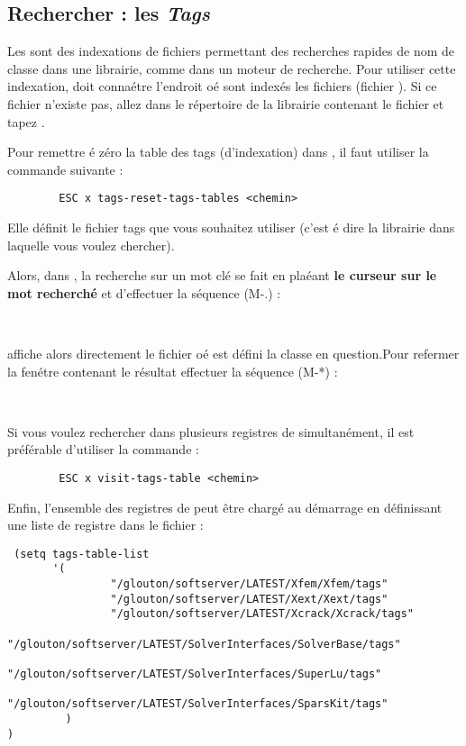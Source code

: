 

\subsection{Rechercher : les \emph{Tags}} \label{tags}

Les  sont des indexations de fichiers permettant des
recherches rapides de nom de classe dans une librairie, comme dans
un moteur de recherche. Pour utiliser cette indexation, 
doit conna\'etre l'endroit o\'e sont index\'es les fichiers (fichier
). Si ce fichier n'existe pas, allez dans le
r\'epertoire de la librairie contenant le fichier  et
tapez .

Pour remettre \'e z\'ero la table des tags (d'indexation) dans
, il faut utiliser la commande  suivante :
\begin{verbatim}
        ESC x tags-reset-tags-tables <chemin>
\end{verbatim}
Elle d\'efinit le fichier tags que vous souhaitez utiliser (c'est \'e
dire la librairie dans laquelle vous voulez chercher).


Alors, dans , la recherche sur un mot cl\'e se fait en
pla\'eant \textbf{ le curseur sur le mot recherch\'e} et d'effectuer la
s\'equence (M-.) :
\begin{description}
 \item[] ~
 \end{description}

 affiche alors  directement le fichier o\'e est d\'efini la
classe en question.Pour refermer la fen\'etre contenant le r\'esultat
effectuer la s\'equence (M-*) :

\begin{description}
 \item[]  ~\touche{*}
 \end{description}

Si vous voulez rechercher dans plusieurs registres de 
simultan\'ement, il est pr\'ef\'erable d'utiliser la commande :
\begin{verbatim}
        ESC x visit-tags-table <chemin>
\end{verbatim}

Enfin, l'ensemble des registres de  peut \^etre charg\'e au
d\'emarrage en d\'efinissant une liste de registre dans le fichier
 :
\begin{verbatim}
 (setq tags-table-list
       '(
                "/glouton/softserver/LATEST/Xfem/Xfem/tags"
                "/glouton/softserver/LATEST/Xext/Xext/tags"
                "/glouton/softserver/LATEST/Xcrack/Xcrack/tags"
                "/glouton/softserver/LATEST/SolverInterfaces/SolverBase/tags"
                "/glouton/softserver/LATEST/SolverInterfaces/SuperLu/tags"
                "/glouton/softserver/LATEST/SolverInterfaces/SparsKit/tags"
         )
)
\end{verbatim}



